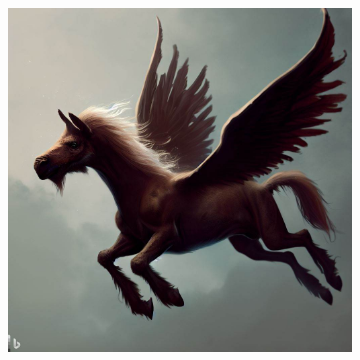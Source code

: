 \documentclass[11pt, twoside]{article}
\begin{document}
\begin{figure}[H]
\begin{subfigure}{0.3\textwidth}
  \end{subfigure}%
  \begin{subfigure}{0.3\textwidth}
    \centering
    \includegraphics[width=0.99\linewidth]{hippo3.jpeg}
  \end{subfigure}
\end{figure}
\end{document}
